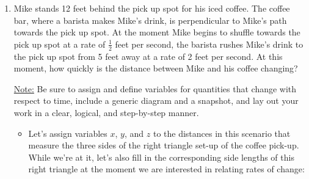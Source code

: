 \documentclass{article}
\begin{document}
\begin{enumerate}
\begin{enumerate}
\item Use implicit differentiation on the equation from part (d) and solve for your goal.

\begin{solution}


 Now that we have a formula for $V$ in terms of $h$, let's implicitly differentiate with respect to time to generate an equation that contains what we know, $\dfrac{dV}{dt}$, and what we want to find, $\dfrac{dh}{dt}$.
\begin{align*}
    \frac{d}{dt} V&= \dfrac{d}{dt} \left(\frac{1}{75}\pi h^3\right) \\
    \dfrac{dV}{dt}&=\frac{1}{25}\pi h^2 \frac{dh}{dt}
\end{align*}
Solving for $\dfrac{dh}{dt}$ when $h=10$, 
\begin{align*}
    \frac{dh}{dt}&=\dfrac{\frac{dV}{dt}}{\frac{1}{25}\pi h^2} \\[4pt]
    &=\dfrac{2}{\frac{1}{25}\pi (10)^2} \\[4pt]
    &=\dfrac{2}{4\pi} \\[4pt]
    &=\dfrac{1}{2\pi} \text{ cm/sec}\\[4pt]
\end{align*}
    
\end{solution}
\probonly{
\vfill} 
\end{enumerate}
\pspace{\newpage}



\item Mike stands 12 feet behind the pick up spot for his iced coffee. The coffee bar, where a barista makes Mike's drink, is perpendicular to Mike's path towards the pick up spot. At the moment Mike begins to shuffle towards the pick up spot at a rate of $\frac{1}{2}$ feet per second, the barista rushes Mike's drink to the pick up spot from 5 feet away at a rate of 2 feet per second. At this moment, how quickly is the distance between Mike and his coffee changing?

\underline{Note:} Be sure to assign and define variables for quantities that change with respect to time, include a generic diagram and a snapshot, and lay out your work in a clear, logical, and step-by-step manner.

\begin{solution}
\begin{itemize}
\item Let's assign variables $x$, $y$, and $z$ to the distances in this scenario that measure the three sides of the right triangle set-up of the coffee pick-up. While we're at it, let's also fill in the corresponding side lengths of this right triangle at the moment we are interested in relating rates of change: 


\end{itemize}
\end{solution}
\end{enumerate}
\end{document}

